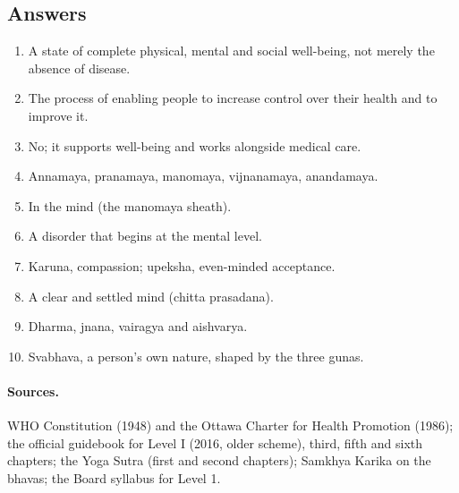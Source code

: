 \subsection*{Answers}
\begin{enumerate}
\item A state of complete physical, mental and social well-being, not merely the absence of disease.
\item The process of enabling people to increase control over their health and to improve it.
\item No; it supports well-being and works alongside medical care.
\item Annamaya, pranamaya, manomaya, vijnanamaya, anandamaya.
\item In the mind (the manomaya sheath).
\item A disorder that begins at the mental level.
\item Karuna, compassion; upeksha, even-minded acceptance.
\item A clear and settled mind (chitta prasadana).
\item Dharma, jnana, vairagya and aishvarya.
\item Svabhava, a person's own nature, shaped by the three gunas.
\end{enumerate}

\paragraph{Sources.} WHO Constitution (1948) and the Ottawa Charter for Health Promotion (1986); the official guidebook for Level I (2016, older scheme), third, fifth and sixth chapters; the Yoga Sutra (first and second chapters); Samkhya Karika on the bhavas; the Board syllabus for Level 1.
